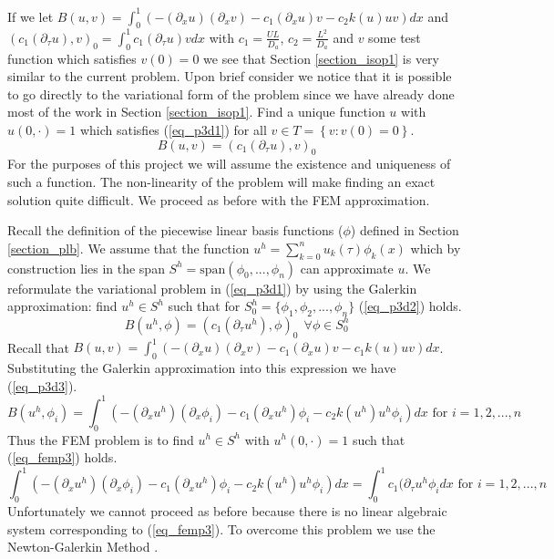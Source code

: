 \documentclass[11pt,fleqn]{article}
\theoremstyle{defstyle}
\begin{document}
If we let $B(u, v) = \int_0^1 \left(-(\partial_xu)(\partial_xv) - c_1(\partial_xu)v - c_2k(u)uv\right)dx$ and $(c_1(\partial_{\tau}u),v)_0 = \int^1_0 c_1(\partial_{\tau}u)v dx$ with $c_1 = \frac{UL}{D_a}$, $c_2 = \frac{L^2}{D_a}$ and $v$ some test function which satisfies $v(0) = 0$ we see that Section \ref{section_isop1} is very similar to the current problem. Upon brief consider we notice that it is possible to go directly to the variational form of the problem since we have already done most of the work in Section \ref{section_isop1}.  Find a unique function $u$ with $u(0, \cdot)=1$ which satisfies (\ref{eq_p3d1}) for all $v \in T=\left\{v:v(0)=0\right\}$.
\begin{equation}
B(u, v) = (c_1(\partial_{\tau}u),v)_0
\label{eq_p3d1}
\end{equation}
For the purposes of this project we will assume the existence and uniqueness of such a function. The non-linearity of the problem will make finding an exact solution quite difficult. We proceed as before with the FEM approximation.

Recall the definition of the piecewise linear basis functions ($\phi$) defined in Section \ref{section_plb}. We assume that the function $u^h =\sum^n_{k=0} u_k(\tau) \phi_k(x)$ which by construction lies in the span $S^h=\text{span}(\phi_0,...,\phi_n)$ can approximate $u$. We reformulate the variational problem in (\ref{eq_p3d1}) by using the Galerkin approximation: find $u^h \in S^h$ such that for $S^h_0=\{\phi_1, \phi_2,...,\phi_n \}$ (\ref{eq_p3d2}) holds.
\begin{equation}
B(u^h, \phi) = (c_1(\partial_{\tau}u^h),\phi)_0~~\forall \phi \in S^h_0
\label{eq_p3d2}
\end{equation} 
Recall that $B(u, v) = \int_0^1 \left(-(\partial_xu)(\partial_xv) - c_1(\partial_xu)v - c_1k(u)uv\right)dx$. Substituting the Galerkin approximation into this expression we have (\ref{eq_p3d3}).
\begin{equation}
B(u^h, \phi_i) = \int_0^1 \left(-(\partial_xu^h)(\partial_x\phi_i) - c_1(\partial_xu^h)\phi_i - c_2k(u^h)u^h\phi_i\right)dx \text{ for } i=1,2,...,n
\label{eq_p3d3}
\end{equation}
Thus the FEM problem is to find $u^h \in S^h$ with $u^h(0,\cdot)=1$ such that (\ref{eq_femp3}) holds.
\begin{equation}
\int_0^1 \left(-(\partial_xu^h)(\partial_x\phi_i) -c_1(\partial_xu^h)\phi_i - c_2k(u^h)u^h\phi_i\right)dx = \int_0^1 c_1(\partial_{\tau}u^h\phi_i dx \text{ for } i=1,2,...,n
\label{eq_femp3}
\end{equation}
Unfortunately we cannot proceed as before because there is no linear algebraic system corresponding to (\ref{eq_femp3}). To overcome this problem we use the Newton-Galerkin Method \cite{larson}.
\end{document}
